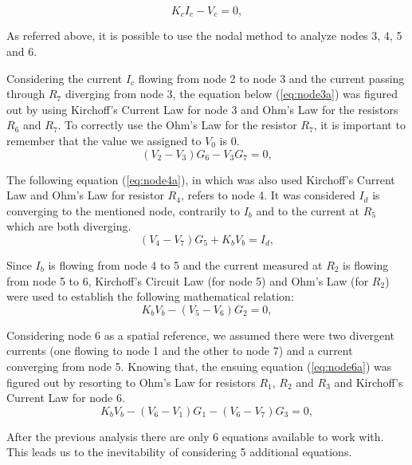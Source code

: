 \begin{equation}
  K_{c}I_{c} - V_{c} = 0,
  \label{eq:given2}
\end{equation}


As referred above, it is possible to use the nodal method to analyze nodes 3, 4, 5 and 6.

Considering the current $I_c$ flowing from node 2 to node 3 and the current passing through $R_7$ diverging from node 3, the equation below (\ref{eq:node3a}) was figured out by using Kirchoff's Current Law for node 3 and Ohm's Law for the resistors $R_6$ and $R_7$. To correctly use the Ohm's Law for the resistor $R_7$, it is important to remember that the value we assigned to $V_0$ is 0.
\begin{equation}
  (V_{2} - V_{3})G_{6} - V_{3}G_{7} = 0,
  \label{eq:node3a}
\end{equation}

The following equation (\ref{eq:node4a}), in which was also used Kirchoff's Current Law and Ohm's Law for resistor $R_4$, refers to node 4. It was considered $I_d$ is converging to the mentioned node, contrarily to $I_b$ and to the current at $R_5$ which are both diverging.
\begin{equation}
  (V_{4} - V_{7})G_{5} + K_{b}V_{b} = I_{d},
  \label{eq:node4a}
\end{equation}

Since $I_b$ is flowing from node 4 to 5 and the current measured at $R_2$ is flowing from node 5 to 6, Kirchoff's Circuit Law (for node 5) and Ohm's Law (for $R_2$) were used to establish the following mathematical relation:
\begin{equation}
  K_{b}V_{b} - (V_{5} - V_{6})G_{2} = 0,
  \label{eq:node5a}
\end{equation}

Considering node 6 as a spatial reference, we assumed there were two divergent currents (one flowing to node 1 and the other to node 7) and a current converging from node 5. Knowing that, the ensuing equation (\ref{eq:node6a}) was figured out by resorting to Ohm's Law for resistors $R_1$, $R_2$ and $R_3$ and Kirchoff's Current Law for node 6. 
\begin{equation}
  K_{b}V_{b} - (V_{6} - V_{1})G_{1} - (V_{6} - V_{7})G_{3} = 0,
  \label{eq:node6a}
\end{equation}

After the previous analysis there are only 6 equations available to work with. This leads us to the inevitability of considering 5 additional equations. 

